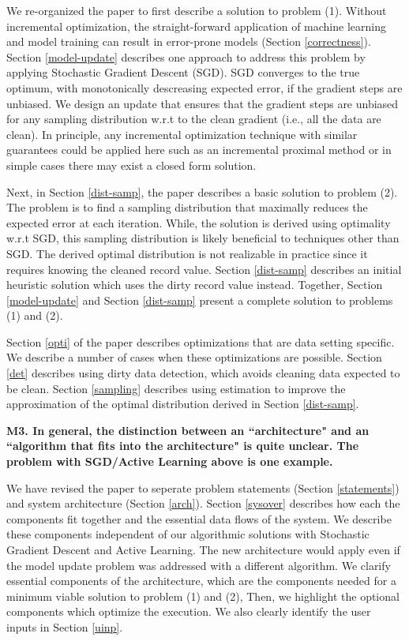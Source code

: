 We re-organized the paper to first describe a solution to problem (1).
Without incremental optimization, the straight-forward application of machine learning and model training can result in error-prone models (Section \ref{correctness}).
Section \ref{model-update} describes one approach to address this problem by applying Stochastic Gradient Descent (SGD).
SGD converges to the true optimum, with monotonically descreasing expected error, if the gradient steps are unbiased.
We design an update that ensures that the gradient steps are unbiased for any sampling distribution w.r.t to the clean gradient (i.e., all the data are clean).
In principle, any incremental optimization technique with similar guarantees could be applied here such as an incremental proximal method or in simple cases there may exist a closed form solution.

Next, in Section \ref{dist-samp}, the paper describes a basic solution to problem (2).
The problem is to find a sampling distribution that maximally reduces the expected error
at each iteration.
While, the solution is derived using optimality w.r.t SGD, this sampling distribution is likely beneficial to techniques other than SGD.
The derived optimal distribution is not realizable in practice since it requires knowing the cleaned record value.
Section \ref{dist-samp} describes an initial heuristic solution which uses the dirty record value instead.
Together, Section \ref{model-update} and Section  \ref{dist-samp} present a complete solution to problems (1) and (2).

Section \ref{opti} of the paper describes optimizations that are data setting specific.
We describe a number of cases when these optimizations are possible.
Section \ref{det} describes using dirty data detection, which avoids cleaning data expected to be clean.
Section \ref{sampling} describes using estimation to improve the approximation of the optimal distribution derived in Section \ref{dist-samp}.

\vspace{0.5em}

\noindent\textbf{M3. In general, the distinction between an ``architecture" and an ``algorithm that fits into the architecture" is quite unclear. The problem with SGD/Active Learning above is one example.}

We have revised the paper to seperate problem statements (Section \ref{statements}) and system architecture (Section \ref{arch}).
Section \ref{sysover} describes how each the components fit together and the essential data flows of the system.
We describe these components independent of our algorithmic solutions with Stochastic Gradient Descent and Active Learning.
The new architecture would apply even if the model update problem was addressed with a different algorithm.
We clarify essential components of the architecture, which are the components needed for a minimum viable solution to problem (1) and (2), 
Then, we highlight the optional components which optimize the execution.
We also clearly identify the user inputs in Section \ref{uinp}.

